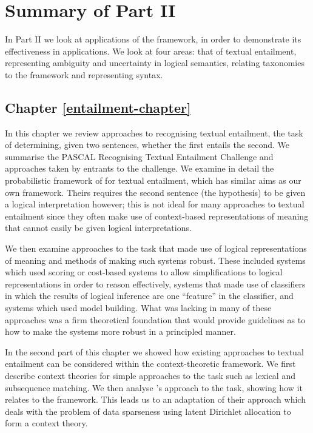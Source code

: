 \section{Summary of Part II}

In Part II we look at applications of the framework, in order to demonstrate its effectiveness in applications. We look at four areas: that of textual entailment, representing ambiguity and uncertainty in logical semantics, relating taxonomies to the framework and representing syntax.

\subsection*{Chapter \ref{entailment-chapter}}

In this chapter we review approaches to recognising textual entailment, the task of determining, given two sentences, whether the first entails the second. We summarise the PASCAL Recognising Textual Entailment Challenge and approaches taken by entrants to the challenge. We examine in detail the probabilistic framework of \citeauthor{Glickman:05} for textual entailment, which has similar aims as our own framework. Theirs requires the second sentence (the hypothesis) to be given a logical interpretation however; this is not ideal for many approaches to textual entailment since they often make use of context-based representations of meaning that cannot easily be given logical interpretations.

We then examine approaches to the task that made use of logical representations of meaning and methods of making such systems robust. These included systems which used scoring or cost-based systems to allow simplifications to logical representations in order to reason effectively, systems that made use of classifiers  in which the results of logical inference are one ``feature'' in the classifier, and systems which used model building. What was lacking in many of these approaches was a firm theoretical foundation that would provide guidelines as to how to make the systems more robust in a principled manner.

In the second part of this chapter we showed how existing approaches to textual entailment can be considered within the context-theoretic framework. We first describe context theories for simple approaches to the task such as lexical and subsequence matching. We then analyse \citeauthor{Glickman:05}'s approach to the task, showing how it relates to the framework. This leads us to an adaptation of their approach which deals with the problem of data sparseness using latent Dirichlet allocation to form a context theory.

